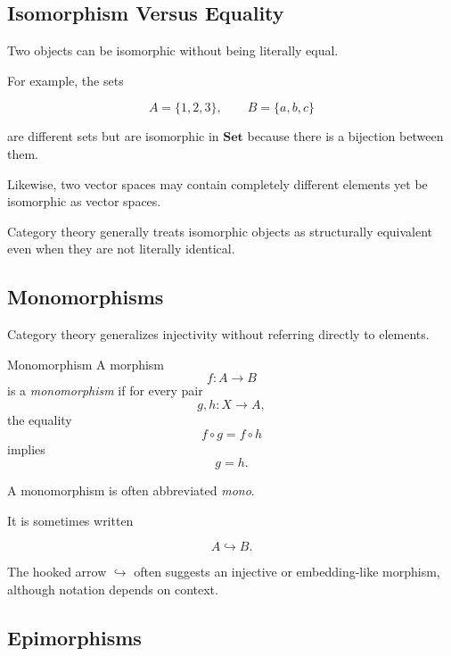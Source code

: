 \subsection{Isomorphism Versus Equality}
\label{subsec:isomorphism-versus-equality}

Two objects can be isomorphic without being literally equal.

For example, the sets

\[ A=\{1,2,3\},\qquad B=\{a,b,c\} \]

are different sets but are isomorphic in \(\mathbf{Set}\) because there is
a bijection between them.

Likewise, two vector spaces may contain completely different elements yet
be isomorphic as vector spaces.

\begin{importantbox}
Category theory generally treats isomorphic objects as structurally
equivalent even when they are not literally identical.
\end{importantbox}

\subsection{Monomorphisms}
\label{subsec:monomorphisms}

Category theory generalizes injectivity without referring directly to
elements.

\begin{definitionbox}{Monomorphism}
A morphism
\[ f:A\to B \]
is a \emph{monomorphism} if for every pair
\[ g,h:X\to A, \]
the equality
\[ f\circ g=f\circ h \]
implies
\[ g=h. \]
\end{definitionbox}

A monomorphism is often abbreviated \emph{mono}.

It is sometimes written

\[ A\hookrightarrow B. \]

The hooked arrow \(\hookrightarrow\) often suggests an injective or
embedding-like morphism, although notation depends on context.

\subsection{Epimorphisms}
\label{subsec:epimorphisms}

